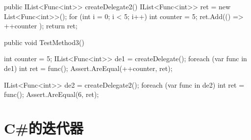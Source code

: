 \begin{CSharp}
        public IList<Func<int>> createDelegate2()
        {
            IList<Func<int>> ret = new List<Func<int>>();
            for (int i = 0; i < 5; i++)
            {
                int counter = 5;    
                ret.Add(() => ++counter );
            }
            return ret;
        }
\end{CSharp}

\begin{CSharp}[运行结果]
        [TestMethod]
        public void TestMethod3()
        {
            int counter = 5;
            IList<Func<int>> de1 = createDelegate();
            foreach (var func in de1)
            {
                int ret = func();
                Assert.AreEqual(++counter, ret);
            }

            IList<Func<int>> de2 = createDelegate2();
            foreach (var func in de2)
            {
                int ret = func();
                Assert.AreEqual(6, ret);
            }
        }
\end{CSharp}


\chapter{C\#的迭代器}


